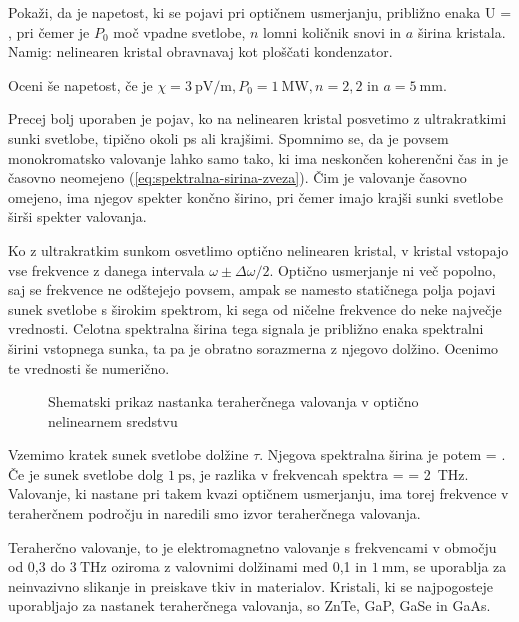 \begin{definition}
Pokaži, da je napetost, ki se pojavi pri optičnem usmerjanju, približno enaka
\beq
U = ,
\eeq
pri čemer je $P_0$ moč vpadne svetlobe, $n$ lomni količnik snovi in $a$ širina kristala.
Namig: nelinearen kristal obravnavaj kot ploščati kondenzator. 

Oceni še napetost, če je
$\chi = 3~\si{\pico\volt/\meter}, P_0 = 1~\si{\mega\watt}, n = 2,2$ in $a = 5~\si{\milli\metre}$. 
\end{definition}

Precej bolj uporaben je pojav, ko na nelinearen kristal posvetimo z ultrakratkimi 
sunki svetlobe, tipično okoli ps ali krajšimi. Spomnimo se, da je povsem monokromatsko valovanje
lahko samo tako, ki ima neskončen koherenčni čas in je časovno neomejeno 
(\ref{eq:spektralna-sirina-zveza}). 
Čim je valovanje časovno omejeno, ima njegov spekter končno širino, pri čemer 
imajo krajši sunki svetlobe širši spekter valovanja. 

Ko z ultrakratkim sunkom osvetlimo optično 
nelinearen kristal, v kristal vstopajo vse frekvence z danega intervala $\omega \pm \Delta \omega/2$.
Optično usmerjanje ni več popolno, saj se frekvence ne odštejejo povsem, ampak se 
namesto statičnega polja pojavi sunek svetlobe s širokim spektrom, ki sega od ničelne
frekvence do neke največje vrednosti. Celotna spektralna širina tega signala je 
približno enaka spektralni širini vstopnega sunka, ta pa je obratno sorazmerna z njegovo dolžino.
Ocenimo te vrednosti še numerično. 

\begin{figure}[h]
\centering
\def\svgwidth{100truemm} 

\caption{Shematski prikaz nastanka teraherčnega valovanja v optično nelinearnem sredstvu}
\label{fig:THz}
\end{figure}

Vzemimo kratek sunek svetlobe dolžine $\tau$. Njegova spektralna širina je potem
\beq
\Delta \omega = .
\eeq
Če je sunek svetlobe dolg $1~\si{\pico\second}$, je razlika v frekvencah 
spektra 
\beq
\Delta \omega =  = 2~\si{\tera\hertz}.
\eeq
Valovanje, ki nastane pri takem kvazi optičnem usmerjanju, ima torej frekvence v teraherčnem
področju in naredili smo izvor teraherčnega valovanja. 

Teraherčno valovanje, to je 
elektromagnetno valovanje s frekvencami v območju od 0,3 do $3~\si{\tera\hertz}$
oziroma z valovnimi dolžinami med 0,1 in $1~\si{\milli\metre}$, 
se uporablja za neinvazivno slikanje in preiskave tkiv in materialov. Kristali, ki 
se najpogosteje uporabljajo za nastanek teraherčnega valovanja, so ZnTe, GaP, GaSe in GaAs.

